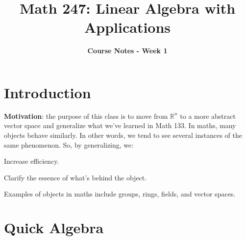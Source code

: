 \documentclass[a4paper, 12pt]{article}
\title{\textbf{Math 247: Linear Algebra with Applications} \vspace{-2ex}}
\author{\textbf{Course Notes - Week 1} \vspace{-2ex}}
\date{}
\renewcommand{\arraystretch}{1.0}
\theoremstyle{definition}
\theoremstyle{definition}
\theoremstyle{definition}
\theoremstyle{definition}
\newenvironment{itemize_tight}{
	\begin{itemize}
		\setlength{\itemsep}{0pt}
		\setlength{\parskip}{0pt}
	}{\end{itemize}}
\begin{document}
\maketitle

\pagestyle{fancy}
\rhead{}
\lfoot{}
\cfoot{}
\renewcommand{\headrulewidth}{0.4pt}
\renewcommand{\footrulewidth}{0.4pt}
\setlength{\tabcolsep}{0.5em} %
{\renewcommand{\arraystretch}{1.2}%

\section{Introduction}
\textbf{Motivation}: the purpose of this class is to move from $\mathbb{R}^n$ to a more abstract vector space and generalize what we've learned in Math 133. In maths, many objects behave similarly. In other words, we tend to see several instances of the same phenomenon. So, by generalizing, we:
\begin{itemize_tight}
	\item Increase efficiency. 
	\item Clarify the essence of what's behind the object. 
\end{itemize_tight}
Examples of objects in maths include groups, rings, fields, and vector spaces. 

\section{Quick Algebra}

}
\end{document}
